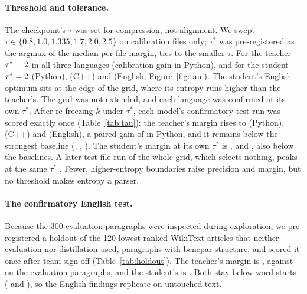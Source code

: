 \paragraph{Threshold and tolerance.} The checkpoint's $\tau$ was set for compression, not alignment. We swept $\tau\in\{0.8,1.0,1.335,1.7,2.0,2.5\}$ on calibration files only; $\tau^*$ was pre-registered as the argmax of the median per-file margin, ties to the smaller $\tau$. For the teacher $\tau^*=2{}$ in all three languages (calibration gain \xTauGainTeacherPy{} in Python), and for the student $\tau^*=2{}$ (Python), \xTauStarStudentCpp{} (C++) and \xTauStarStudentEn{} (English; Figure~\ref{fig:tau}). The student's English optimum sits at the edge of the grid, where its entropy runs higher than the teacher's. The grid was not extended, and each language was confirmed at its own $\tau^*$. After re-freezing $k$ under $\tau^*$, each model's confirmatory test run was scored exactly once (Table~\ref{tab:tau}): the teacher's margin rises to \xTauConfTeacherPy{} (Python), \xTauConfTeacherCpp{} (C++) and \xTauConfTeacherEn{} (English), a paired gain of \xTauPairGainTeacherPy{} \xTauPairGainCITeacherPy{} in Python, and it remains below the strongest baseline (\xTauConfVsBaseTeacherPy{}, \xTauConfVsBaseTeacherCpp{}, \xTauConfVsBaseTeacherEn{}). The student's margin at its own $\tau^*$ is \xTauConfStudentPy{}, \xTauConfStudentCpp{} and \xTauConfStudentEn{}, also below the baselines. A later test-file run of the whole grid, which selects nothing, peaks at the same $\tau^*$ . Fewer, higher-entropy boundaries raise precision and margin, but no threshold makes entropy a parser.


\paragraph{The confirmatory English test.} Because the 300 evaluation paragraphs were inspected during exploration, we pre-registered a holdout of the 120 lowest-ranked WikiText articles that neither evaluation nor distillation used, \xHoldFiles{} paragraphs with benepar structure, and scored it once after team sign-off (Table~\ref{tab:holdout}). The teacher's margin is \xHoldTeaMargin{}, against \MarginEn{} on the evaluation paragraphs, and the student's is \xHoldStuMargin{}. Both stay below word starts (\xHoldTeaVsWord{} and \xHoldStuVsWord{}), so the English findings replicate on untouched text.

